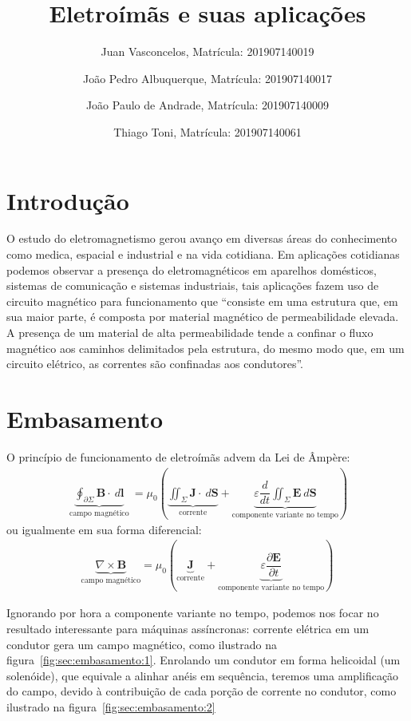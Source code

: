 \documentclass[11pt]{article}
\title{Eletro\'im\~as e suas aplicaç\~oes}
\author{Juan Vasconcelos, Matrícula: 201907140019 \and Jo\~ao Pedro Albuquerque, Matrícula: 201907140017 \and Jo\~ao Paulo de Andrade, Matrícula: 201907140009 \and Thiago Toni, Matrícula: 201907140061}
\date{}
\begin{document}
\maketitle

\section{Introdução}\label{sec:introdução}
O estudo do eletromagnetismo gerou avanço em diversas áreas do conhecimento  como
medica, espacial e industrial e na vida cotidiana. Em aplicações cotidianas podemos
observar a presença do eletromagnéticos em aparelhos domésticos, sistemas de
comunicação e sistemas industriais, tais aplicações fazem uso de circuito magnético
para funcionamento que “consiste em uma estrutura que, em sua maior parte, é
composta por material magnético de permeabilidade elevada. A presença de um
material de alta permeabilidade tende a confinar o fluxo magnético aos caminhos
delimitados pela estrutura, do mesmo modo que, em um circuito elétrico, as correntes
são confinadas aos condutores”.

\section{Embasamento}\label{sec:embasamento}
O princípio de funcionamento de eletroímãs advem da Lei de Âmpère:
\begin{gather}
  \underbrace{ \oint_{\partial \Sigma} \bm{B} \cdot \: d{\bm{l}} }_\text{ campo magnético } = \mu_0 \left( \underbrace{ \iint_{\Sigma} \bm{J} \cdot \: d{\bm{S}} }_\text{corrente} + \underbrace{ \varepsilon \dfrac{d}{dt} \iint_{\Sigma} \bm{E} \: d{\bm{S}} }_\text{componente variante no tempo}  \right)
\end{gather}
ou igualmente em sua forma diferencial:
\begin{gather}
  \underbrace{\nabla \times \bm{B}}_\text{campo magnético} = \mu_0 \left( \underbrace{\bm{J}}_\text{corrente} + \underbrace{\varepsilon \dfrac{\partial \bm{E}}{\partial t}}_\text{componente variante no tempo} \right) 
\end{gather}

Ignorando por hora a componente variante no tempo, podemos nos focar no resultado
interessante para máquinas assíncronas: corrente elétrica em um condutor gera um
campo magnético, como ilustrado na figura~\ref{fig:sec:embasamento:1}. Enrolando
um condutor em forma helicoidal (um solenóide), que equivale a alinhar anéis em
sequência, teremos uma amplificação do campo, devido à contribuição de cada porção
de corrente no condutor, como ilustrado na figura~\ref{fig:sec:embasamento:2}
\end{document}
